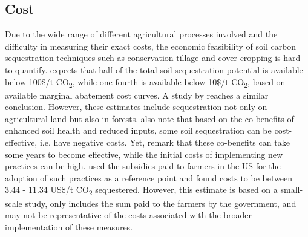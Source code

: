 \subsection*{Cost}
Due to the wide range of different agricultural processes involved and the difficulty in measuring their exact costs, the economic feasibility of soil carbon sequestration techniques such as conservation tillage and cover cropping is hard to quantify. \textcite{Bossio2020TheSolutions} expects that half of the total soil sequestration potential is available below 100\$/t CO\textsubscript{2}, while one-fourth is available below 10\$/t CO\textsubscript{2}, based on available marginal abatement cost curves. A study by \textcite{McKinsey2009PathwaysEconomy} reaches a similar conclusion. However, these estimates include sequestration not only on agricultural land but also in forests. \textcite{Bossio2020TheSolutions} also note that based on the co-benefits of enhanced soil health and reduced inputs, some soil sequestration can be cost-effective, i.e. have negative costs. Yet, \textcite{Zoebisch2022SoilMoonshot} remark that these co-benefits can take some years to become effective, while the initial costs of implementing new practices can be high.
\textcite{Chambers2016SoilInitiative} used the subsidies paid to farmers in the US for the adoption of such practices as a reference point and found costs to be between 3.44 - 11.34 US\$/t CO\textsubscript{2} sequestered. However, this estimate is based on a small-scale study, only includes the sum paid to the farmers by the government, and may not be representative of the costs associated with the broader implementation of these measures.

